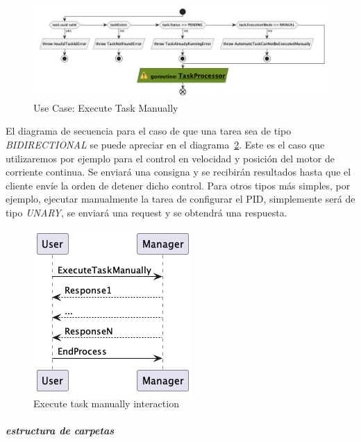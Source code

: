 \begin{figure}[H]
    \centering
    \includegraphics[height=0.2\textheight]{./part/Proyecto_ejecutivo/memoria_descriptiva/descripcionDelProyecto/manager/uml/1-executeTaskManual}
    \caption{Use Case: Execute Task Manually}\label{fig:Use Case-Execute Task Manually}
\end{figure}

El diagrama de secuencia para el caso de que una tarea sea de tipo \textit{BIDIRECTIONAL} se puede apreciar en el diagrama~\cref{fig:executeTaskManualInteraction}. Este es el caso que utilizaremos por ejemplo para el control en velocidad y posición del motor de corriente continua. Se enviará una consigna y se recibirán resultados hasta que el cliente envíe la orden de detener dicho control. Para otros tipos más simples, por ejemplo, ejecutar manualmente la tarea de configurar el PID, simplemente será de tipo \textit{UNARY}, se enviará una request y se obtendrá una respuesta.

\begin{figure}[H]
    \centering
    \includegraphics[height=0.2\textheight]{./part/Proyecto_ejecutivo/memoria_descriptiva/descripcionDelProyecto/manager/uml/1-ExecuteTaskManuallyInteraction}
    \caption{Execute task manually interaction}\label{fig:executeTaskManualInteraction}
\end{figure}

\subparagraph{estructura de carpetas}

